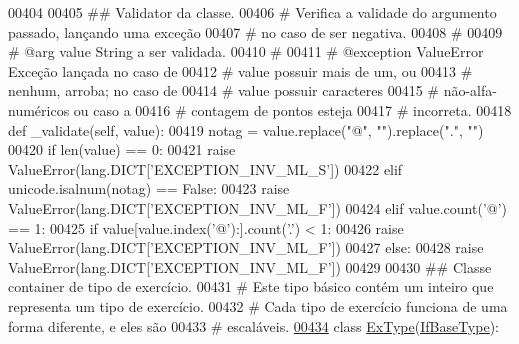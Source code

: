 \begin{DoxyCode}
00404 
00405     \textcolor{comment}{## Validator da classe.}
00406     \textcolor{comment}{#   Verifica a validade do argumento passado, lançando uma exceção}
00407     \textcolor{comment}{#   no caso de ser negativa.}
00408     \textcolor{comment}{#}
00409     \textcolor{comment}{#   @arg        value       String a ser validada.}
00410     \textcolor{comment}{#}
00411     \textcolor{comment}{#   @exception  ValueError  Exceção lançada no caso de}
00412     \textcolor{comment}{#                           value possuir mais de um, ou}
00413     \textcolor{comment}{#                           nenhum, arroba; no caso de}
00414     \textcolor{comment}{#                           value possuir caracteres}
00415     \textcolor{comment}{#                           não-alfa-numéricos ou caso a}
00416     \textcolor{comment}{#                           contagem de pontos esteja}
00417     \textcolor{comment}{#                           incorreta.}
00418     \textcolor{keyword}{def }\_validate(self, value):
00419         notag = value.replace(\textcolor{stringliteral}{"@"}, \textcolor{stringliteral}{""}).replace(\textcolor{stringliteral}{"."}, \textcolor{stringliteral}{""})
00420         \textcolor{keywordflow}{if} len(value) == 0:
00421             \textcolor{keywordflow}{raise} ValueError(lang.DICT[\textcolor{stringliteral}{'EXCEPTION\_INV\_ML\_S'}])
00422         \textcolor{keywordflow}{elif} unicode.isalnum(notag) == \textcolor{keyword}{False}:
00423             \textcolor{keywordflow}{raise} ValueError(lang.DICT[\textcolor{stringliteral}{'EXCEPTION\_INV\_ML\_F'}])
00424         \textcolor{keywordflow}{elif} value.count(\textcolor{stringliteral}{'@'}) == 1:
00425             \textcolor{keywordflow}{if} value[value.index(\textcolor{stringliteral}{'@'}):].count(\textcolor{stringliteral}{'.'}) < 1:
00426                 \textcolor{keywordflow}{raise} ValueError(lang.DICT[\textcolor{stringliteral}{'EXCEPTION\_INV\_ML\_F'}])
00427         \textcolor{keywordflow}{else}:
00428             \textcolor{keywordflow}{raise} ValueError(lang.DICT[\textcolor{stringliteral}{'EXCEPTION\_INV\_ML\_F'}])
00429         
00430 \textcolor{comment}{## Classe container de tipo de exercício.}
00431 \textcolor{comment}{#   Este tipo básico contém um inteiro que representa um tipo de exercício.}
00432 \textcolor{comment}{#   Cada tipo de exercício funciona de uma forma diferente, e eles são}
00433 \textcolor{comment}{#   escaláveis.}
\hypertarget{BaseUnit_8py_source_l00434}{}\hyperlink{classELO_1_1BaseUnit_1_1ExType}{00434} \textcolor{keyword}{class }\hyperlink{classELO_1_1BaseUnit_1_1ExType}{ExType}(\hyperlink{classELO_1_1BaseUnit_1_1IfBaseType}{IfBaseType}):

\end{DoxyCode}
